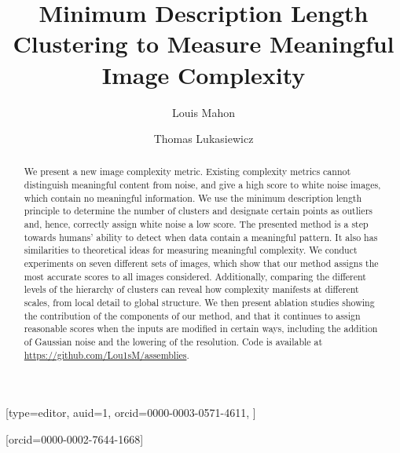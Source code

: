 \documentclass[a4paper,fleqn]{cas-sc}
\title{Minimum Description Length Clustering to Measure Meaningful Image Complexity}
\theoremstyle{remark}
\begin{document}


%
\author[1,3]{Louis Mahon}[type=editor,
       auid=1,
       orcid=0000-0003-0571-4611,
       ]





\author[2,3]{Thomas Lukasiewicz}[orcid=0000-0002-7644-1668]


\maketitle


\doublespacing


\begin{abstract}
       We present a new image complexity metric. Existing complexity metrics cannot distinguish meaningful content from noise, and give a high score to white noise images, which contain no meaningful information. We use the minimum description length principle to determine the number of clusters and designate certain points as outliers and, hence, correctly assign white noise a low score. 
       The presented method is a step towards humans' ability to detect when data contain a meaningful pattern. It also has similarities to theoretical ideas for measuring meaningful complexity.
       We conduct experiments on seven different sets of images, which show that our method assigns the most accurate scores to all images considered. Additionally, comparing the different levels of the hierarchy of clusters can reveal how complexity manifests at different scales, from local detail to global structure. We then present ablation studies showing the contribution of the components of our method, and that it continues to assign reasonable scores when the inputs are modified in certain ways, including the addition of Gaussian noise and the lowering of the resolution. Code is available at \url{https://github.com/Lou1sM/assemblies}.
\end{abstract}
\end{document}
